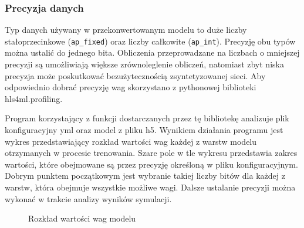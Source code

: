\documentclass[12pt, oneside, a4paper]{article}
\begin{document}
\subsubsection{Precyzja danych}
Typ danych używany w przekonwertowanym modelu to duże liczby
stałoprzecinkowe (\lstinline{ap_fixed}) oraz liczby całkowite
(\lstinline{ap_int}).
Precyzję obu typów można ustalić do jednego bita.
Obliczenia przeprowadzane na liczbach o mniejszej
precyzji są umożliwiają większe zrównoleglenie obliczeń,
natomiast zbyt niska precyzja może poskutkować
bezużytecznością zsyntetyzowanej sieci. Aby odpowiednio dobrać precyzję
wag skorzystano z pythonowej biblioteki hls4ml.profiling.

Program korzystający z funkcji dostarczanych przez tę bibliotekę
analizuje plik konfiguracyjny yml oraz model z pliku h5.
Wynikiem działania programu jest wykres przedstawiający
rozkład wartości wag każdej z warstw modelu otrzymanych w procesie trenowania.
Szare pole w tle wykresu
przedstawia zakres wartości, które obejmowane są przez precyzję określoną
w pliku konfiguracyjnym. Dobrym punktem początkowym jest wybranie takiej
liczby bitów dla każdej z warstw, która obejmuje wszystkie możliwe wagi.
Dalsze ustalanie precyzji można wykonać w trakcie analizy wyników
symulacji.
\begin{figure}[H]
  
  \caption{Rozkład wartości wag modelu}\label{fig:weights_dist}
  \centering
\end{figure}
\end{document}
